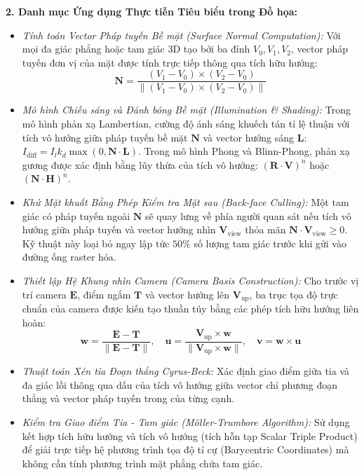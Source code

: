 \textbf{2. Danh mục Ứng dụng Thực tiễn Tiêu biểu trong Đồ họa:}
\begin{itemize}
    \item \textit{Tính toán Vector Pháp tuyến Bề mặt (Surface Normal Computation):} Với mọi đa giác phẳng hoặc tam giác 3D tạo bởi ba đỉnh $V_0, V_1, V_2$, vector pháp tuyến đơn vị của mặt được tính trực tiếp thông qua tích hữu hướng:
    \begin{equation}
    \mathbf{N} = \frac{(V_1 - V_0) \times (V_2 - V_0)}{\|(V_1 - V_0) \times (V_2 - V_0)\|}
    \end{equation}
    \item \textit{Mô hình Chiếu sáng và Đánh bóng Bề mặt (Illumination \& Shading):}
    Trong mô hình phản xạ Lambertian, cường độ ánh sáng khuếch tán tỉ lệ thuận với tích vô hướng giữa pháp tuyến bề mặt $\mathbf{N}$ và vector hướng sáng $\mathbf{L}$: $I_{\text{diff}} = I_l k_d \max(0, \mathbf{N} \cdot \mathbf{L})$. Trong mô hình Phong và Blinn-Phong, phản xạ gương được xác định bằng lũy thừa của tích vô hướng: $(\mathbf{R} \cdot \mathbf{V})^n$ hoặc $(\mathbf{N} \cdot \mathbf{H})^n$.
    \item \textit{Khử Mặt khuất Bằng Phép Kiểm tra Mặt sau (Back-face Culling):} Một tam giác có pháp tuyến ngoài $\mathbf{N}$ sẽ quay lưng về phía người quan sát nếu tích vô hướng giữa pháp tuyến và vector hướng nhìn $\mathbf{V}_{\text{view}}$ thỏa mãn $\mathbf{N} \cdot \mathbf{V}_{\text{view}} \ge 0$. Kỹ thuật này loại bỏ ngay lập tức $50\%$ số lượng tam giác trước khi gửi vào đường ống raster hóa.
    \item \textit{Thiết lập Hệ Khung nhìn Camera (Camera Basis Construction):} Cho trước vị trí camera $\mathbf{E}$, điểm ngắm $\mathbf{T}$ và vector hướng lên $\mathbf{V}_{\text{up}}$, ba trục tọa độ trực chuẩn của camera được kiến tạo thuần túy bằng các phép tích hữu hướng liên hoàn:
    \begin{equation}
    \mathbf{w} = \frac{\mathbf{E} - \mathbf{T}}{\|\mathbf{E} - \mathbf{T}\|}, \quad \mathbf{u} = \frac{\mathbf{V}_{\text{up}} \times \mathbf{w}}{\|\mathbf{V}_{\text{up}} \times \mathbf{w}\|}, \quad \mathbf{v} = \mathbf{w} \times \mathbf{u}
    \end{equation}
    \item \textit{Thuật toán Xén tỉa Đoạn thẳng Cyrus-Beck:} Xác định giao điểm giữa tia và đa giác lồi thông qua dấu của tích vô hướng giữa vector chỉ phương đoạn thẳng và vector pháp tuyến trong của từng cạnh.
    \item \textit{Kiểm tra Giao điểm Tia - Tam giác (Möller-Trumbore Algorithm):} Sử dụng kết hợp tích hữu hướng và tích vô hướng (tích hỗn tạp Scalar Triple Product) để giải trực tiếp hệ phương trình tọa độ tỉ cự (Barycentric Coordinates) mà không cần tính phương trình mặt phẳng chứa tam giác.
\end{itemize}

